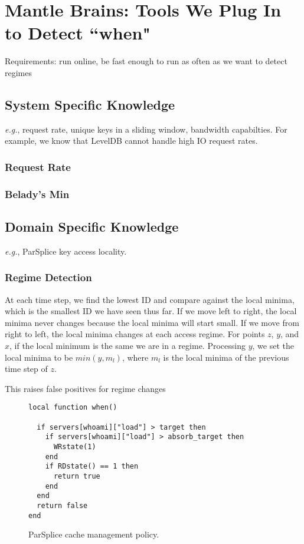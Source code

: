 \section{Mantle Brains: Tools We Plug In to Detect ``when"}

Requirements: run online, be fast enough to run as often as we want to detect
regimes

\subsection{System Specific Knowledge}

{\it e.g.}, request rate, unique keys in a sliding window, bandwidth
capabilties. For example, we know that LevelDB cannot handle high IO request
rates.

\subsubsection{Request Rate}

\subsubsection{Belady's Min}

\subsection{Domain Specific Knowledge}

{\it e.g.}, ParSplice key access locality.

\subsubsection{Regime Detection}

At each time step, we find the lowest ID and compare against the local minima,
which is the smallest ID we have seen thus far. If we move left to right, the
local minima never changes because the local minima will start small. If we
move from right to left, the local minima changes at each access regime.  For
points \(z\), \(y\), and \(x\), if the local minimum is the same we are in a
regime. Processing \(y\), we set the local minima to be \(min(y, m_l)\), where
\(m_l\) is the local minima of the previous time step of \(z\).

This
raises false positives for regime changes


\begin{figure}[tb]
\begin{verbatim}
local function when()
  
  if servers[whoami]["load"] > target then
    if servers[whoami]["load"] > absorb_target then
      WRstate(1)
    end
    if RDstate() == 1 then
      return true
    end
  end
  return false
end
\end{verbatim}
\caption{ParSplice cache management policy.\label{lua:parsplice}}
\end{figure}



